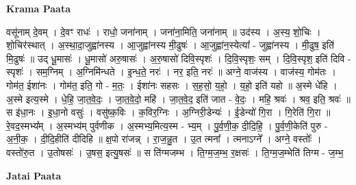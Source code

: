 \documentclass[17pt]{extarticle}
\begin{document}
\textbf{Krama Paata} \newline

वसू॑नाम् दे॒वम् । दे॒वꣳ राधः॑ । राधो॒ जना॑नाम् । जना॑ना॒मिति॒ जना॑नाम् ॥ उद॑स्य । अ॒स्य॒ शो॒चिः । शो॒चिर॑स्थात् । अ॒स्था॒दा॒जुह्वा॑नस्य । आ॒जुह्वा॑नस्य मी॒ढुषः॑ । आ॒जुह्वा॑न॒स्येत्या᳚ - जुह्वा॑नस्य । मी॒ढुष॒ इति॑ मि॒ढुषः॑ ॥ उद् धू॒मासः॑ । धू॒मासो॑ अरु॒षासः॑ । अ॒रु॒षासो॑ दिवि॒स्पृशः॑ । दि॒वि॒स्पृशः॒ सम् । दि॒वि॒स्पृश॒ इति॑ दिवि - स्पृशः॑ । सम॒ग्निम् । अ॒ग्निमि॑न्धते । इ॒न्ध॒ते॒ नरः॑ । नर॒ इति॒ नरः॑ ॥ अग्ने॒ वाज॑स्य । वाज॑स्य॒ गोम॑तः । गोम॑त॒ ईशा॑नः । गोम॑त॒ इति॒ गो - म॒तः॒ । ईशा॑नः सहसः । स॒ह॒सो॒ य॒हो॒ । य॒हो॒ इति॑ यहो ॥ अ॒स्मे धे॑हि । अ॒स्मे इत्य॒स्मे । धे॒हि॒ जा॒त॒वे॒दः॒ । जा॒त॒वे॒दो॒ महि॑ । जा॒त॒वे॒द॒ इति॑ जात - वे॒दः॒ । महि॒ श्रवः॑ । श्रव॒ इति॒ श्रवः॑ ॥ स इ॑धा॒नः । इ॒धा॒नो वसुः॑ । वसु॑ष्क॒विः । क॒विर॒ग्निः । अ॒ग्निरी॒डेन्यः॑ । ई॒डेन्यो॑ गि॒रा । गि॒रेति॑ गि॒रा ॥ रे॒वद॒स्मभ्य᳚म् । अ॒स्मभ्य॑म् पुर्वणीक । अ॒स्मभ्य॒मित्य॒स्म - भ्य॒म् । पु॒र्व॒णी॒क॒ दी॒दि॒हि॒ । पु॒र्व॒णी॒केति॑ पुरु - अ॒नी॒क॒ । दी॒दि॒हीति॑ दीदिहि ॥ क्ष॒पो रा॑जन्न् । रा॒ज॒न्नु॒त । उ॒त त्मना᳚ । त्मनाऽग्ने᳚ । अग्ने॒ वस्तोः᳚ । वस्तो॑रु॒त । उ॒तोषसः॑ । उ॒षस॒ इत्यु॒षसः॑ ॥ स ति॑ग्मजम्भ । ति॒ग्म॒ज॒म्भ॒ र॒क्षसः॑ । ति॒ग्म॒ज॒म्भेति॑ तिग्म - ज॒म्भ॒ \newline

\textbf{Jatai Paata} \newline
\end{document}
